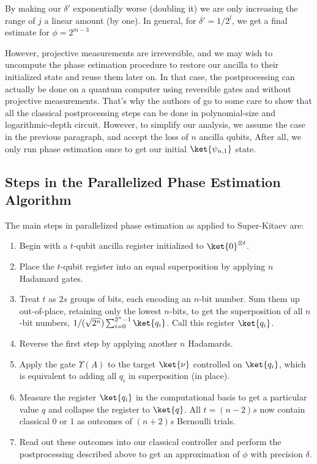 By making our $\delta'$
exponentially worse (doubling it) we are only increasing the range of
$j$ a linear amount (by one). In general, for $\delta'=1/2^l$, we get
a final estimate for $\phi = 2^{m-3}$

However, projective measurements are irreversible, and we may wish to
uncompute the phase estimation procedure to restore our ancilla to
their initialized state and reuse them later on. In that case, the
postprocessing can actually be done on a quantum computer using
reversible gates and without projective measurements. That's why
the authors of \cite{ksv02} go to some care to show that all the classical
postprocessing steps can be done in polynomial-size and logarithmic-depth
circuit.
However, to simplify our analysis, we assume the case
in the previous paragraph, and accept the
loss of $n$ ancilla qubits, After all, we only run phase estimation once
to get our initial $\ket{\psi_{n,1}}$ state.

\subsection{Steps in the Parallelized Phase Estimation Algorithm}

The main steps in parallelized phase estimation as applied to Super-Kitaev
are:

\begin{enumerate}

\item Begin with a $t$-qubit ancilla register initialized to $\ket{0}^{\otimes t}$.

\item Place the $t$-qubit register into an equal superposition by
applying $n$ Hadamard gates.

\item Treat $t$ as $2s$ groups of bits, each encoding an $n$-bit number.
Sum them up out-of-place, retaining only the lowest $n$-bits,
to get the superposition
of all $n$-bit numbers, $1/(\sqrt{2^{n}}) \sum_{i=0}^{2^n-1} \ket{q_i}$.
Call this register $\ket{q_i}$.

\item Reverse the first step by applying another $n$ Hadamards.

\item Apply the gate $\Upsilon(A)$ to the target $\ket{\nu}$ controlled
on $\ket{q_i}$, which is equivalent to adding all $q_i$ in superposition
(in place).

\item Measure the register $\ket{q_i}$ in the computational basis to get 
a particular value $q$ and collapse the register to $\ket{q}$. All $t=(n-2)s$
now contain classical $0$ or $1$ as outcomes of $(n+2)s$ Bernoulli trials.

\item Read out these outcomes into our classical controller
and perform the postprocessing
described above to get an approximation of $\phi$ with precision $\delta$.

\end{enumerate}
